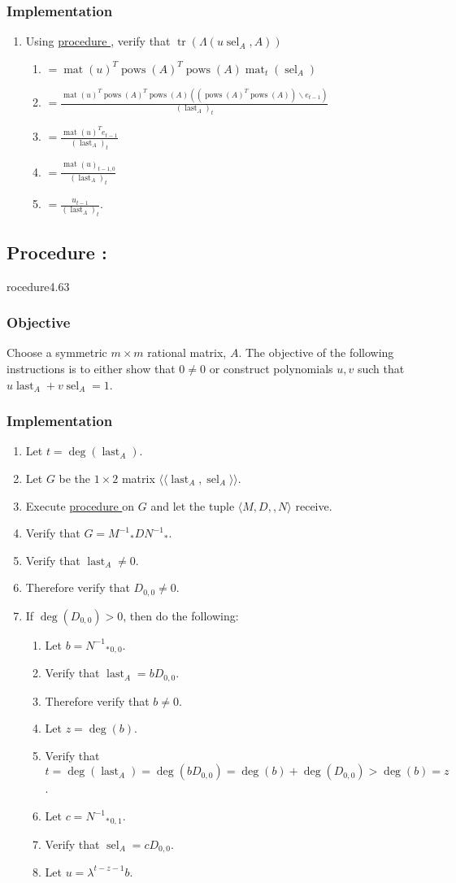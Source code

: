 \documentclass{article}
\DeclareMathOperator{\mat}{mat}
\DeclareMathOperator{\tr}{tr}
\DeclareMathOperator{\pows}{pows}
\DeclareMathOperator{\sel}{sel}
\DeclareMathOperator{\last}{last}
\newcounter{procedure}[part]
\newcommand{\procedure}[1]{\subsection*{Procedure \thepart:\theprocedure}\label{sec:procedure #1}\global\expandafter\edef\csname procedure#1\endcsname{\thepart:\theprocedure}\addtocounter{procedure}{1}}
\newcommand{\objective}{\subsubsection*{Objective}}
\newcommand{\implementation}{\subsubsection*{Implementation}}
\newcommand{\procedurehr}[1]{\hyperref[sec:procedure #1]{procedure \expandafter\csname procedure#1\endcsname}}
\begin{document}
\begin{multicols}{2}
			\implementation
				\begin{enumerate}
					\item Using \procedurehr{4.61}, verify that $\tr(\Lambda(u\sel_A,A))$
					\begin{enumerate}
						\item $=\mat(u)^T\pows(A)^T\pows(A)\mat_t(\sel_A)$
						\item $=\frac{\mat(u)^T\pows(A)^T\pows(A)((\pows(A)^T\pows(A))\backslash e_{t-1})}{(\last_A)_t}$
						\item $=\frac{\mat(u)^Te_{t-1}}{(\last_A)_t}$
						\item $=\frac{\mat(u)_{t-1,0}}{(\last_A)_t}$
						\item $=\frac{u_{t-1}}{(\last_A)_t}$.
					\end{enumerate}
				\end{enumerate}
		\procedure{4.63}
			\objective
				Choose a symmetric $m\times m$ rational matrix, $A$. The objective of the following instructions is to either show that $0\ne 0$ or construct polynomials $u,v$ such that $u\last_A+v\sel_A=1$.
			\implementation
				\begin{enumerate}
					\item Let $t=\deg(\last_A)$.
					\item Let $G$ be the $1\times 2$ matrix $\langle\langle\last_A,\sel_A\rangle\rangle$.
					\item Execute \procedurehr{4.25} on $G$ and let the tuple $\langle M,D,,N\rangle$ receive.
					\item Verify that $G={M^{-1}}_*D{N^{-1}}_*$.
					\item Verify that $\last_A\ne 0$.
					\item Therefore verify that $D_{0,0}\ne 0$.
					\item If $\deg(D_{0,0})>0$, then do the following:
					\begin{enumerate}
						\item Let $b={{N^{-1}}_*}_{0,0}$.
						\item Verify that $\last_A=bD_{0,0}$.
						\item Therefore verify that $b\ne 0$.
						\item Let $z=\deg(b)$.
						\item Verify that $t=\deg(\last_A)=\deg(bD_{0,0})=\deg(b)+\deg(D_{0,0})>\deg(b)=z$.
						\item Let $c={{N^{-1}}_*}_{0,1}$.
						\item Verify that $\sel_A=cD_{0,0}$.
						\item Let $u=\lambda^{t-z-1}b$.

\end{enumerate}
\end{enumerate}
\end{multicols}
\end{document}
